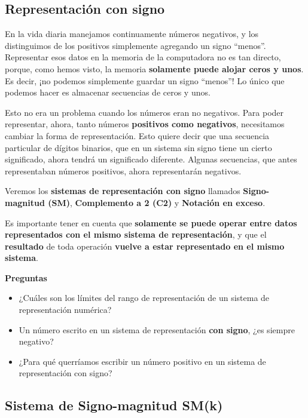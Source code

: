 \documentclass[spanish,a4paper,]{article}
\providecommand{\tightlist}{%
  \setlength{\itemsep}{0pt}\setlength{\parskip}{0pt}}
\begin{document}
\hypertarget{representaciuxf3n-con-signo}{%
\subsection{Representación con
signo}\label{representaciuxf3n-con-signo}}

En la vida diaria manejamos continuamente números negativos, y los
distinguimos de los positivos simplemente agregando un signo ``menos''.
Representar esos datos en la memoria de la computadora no es tan
directo, porque, como hemos visto, la memoria \textbf{solamente puede
alojar ceros y unos}. Es decir, ¡no podemos simplemente guardar un signo
``menos''! Lo único que podemos hacer es almacenar secuencias de ceros y
unos.

Esto no era un problema cuando los números eran no negativos. Para poder
representar, ahora, tanto números \textbf{positivos como negativos},
necesitamos cambiar la forma de representación. Esto quiere decir que
una secuencia particular de dígitos binarios, que en un sistema sin
signo tiene un cierto significado, ahora tendrá un significado
diferente. Algunas secuencias, que antes representaban números
positivos, ahora representarán negativos.

Veremos los \textbf{sistemas de representación con signo} llamados
\textbf{Signo-magnitud (SM)}, \textbf{Complemento a 2 (C2)} y
\textbf{Notación en exceso}.

Es importante tener en cuenta que \textbf{solamente se puede operar
entre datos representados con el mismo sistema de representación}, y que
el \textbf{resultado} de toda operación \textbf{vuelve a estar
representado en el mismo sistema}.

\textbf{Preguntas}

\begin{itemize}
\tightlist
\item
  ¿Cuáles son los límites del rango de representación de un sistema de
  representación numérica?
\item
  Un número escrito en un sistema de representación \textbf{con signo},
  ¿es siempre negativo?
\item
  ¿Para qué querríamos escribir un número positivo en un sistema de
  representación con signo?
\end{itemize}

\hypertarget{sistema-de-signo-magnitud-smk}{%
\subsection{Sistema de Signo-magnitud
SM(k)}\label{sistema-de-signo-magnitud-smk}}
\end{document}
